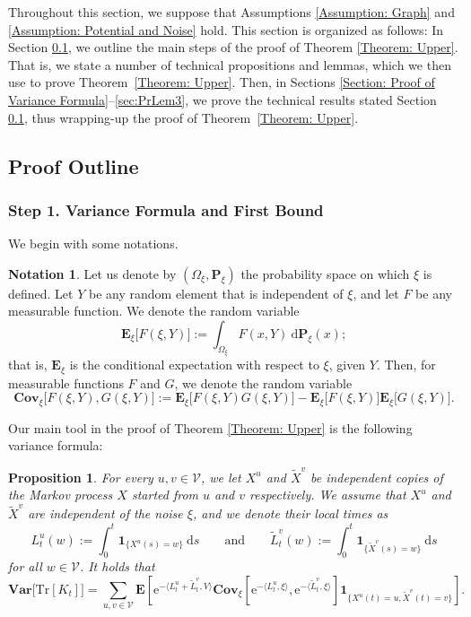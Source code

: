 \documentclass{amsart}
\numberwithin{equation}{section}
\newtheorem{proposition}[theorem]{Proposition}
\theoremstyle{definition}
\newtheorem{notation}[theorem]{Notation}
\newcommand\Om{\Omega}
\renewcommand\d{~\mathrm d}
\newcommand\mbf{\mathbf}
\newcommand\mr{\mathrm}
\newcommand\ms{\mathscr}
\begin{document}
%

Throughout this section, we suppose that Assumptions
\ref{Assumption: Graph} and \ref{Assumption: Potential and Noise} hold.
This section is organized as follows: In Section \ref{Section: Outline 2}, we outline the
main steps of the proof of Theorem \ref{Theorem: Upper}.
That is, we state a number of technical propositions and lemmas,
which we then use to prove Theorem~\ref{Theorem: Upper}. Then, in Sections
\ref{Section: Proof of Variance Formula}--\ref{sec:PrLem3}, we prove the technical results stated
Section \ref{Section: Outline 2}, thus wrapping-up the proof
of Theorem~\ref{Theorem: Upper}.


%

\subsection{Proof Outline}
\label{Section: Outline 2}

%

\subsubsection{Step 1. Variance Formula and First Bound}

%

We begin with some notations.
\begin{notation}
\label{Notation: Conditional Expectation}
Let us denote by $(\Om_\xi,\mbf P_\xi)$ the probability space on which $\xi$
is defined. Let $Y$ be any random element that is independent of $\xi$,
and let $F$ be any measurable function. We denote the random variable
\[\mbf E_\xi\big[F(\xi,Y)\big]:=\int_{\Om_\xi} F(x,Y)\d\mbf P_\xi(x);\]
that is, $\mbf E_\xi$ is the conditional expectation with respect to
$\xi$, given $Y$. Then, for measurable functions $F$ and $G$,
we denote the random variable
\[\mbf{Cov}_\xi\big[F(\xi,Y),G(\xi,Y)\big]:=\mbf E_\xi\big[F(\xi,Y)G(\xi,Y)\big]-\mbf E_\xi\big[F(\xi,Y)\big]\mbf E_\xi\big[G(\xi,Y)\big].\]
\end{notation}
Our main tool in the proof of Theorem \ref{Theorem: Upper} is the following variance formula:

%

\begin{proposition}
\label{Proposition: Variance Formula}
For every $u,v\in\ms V$,
we let $X^u$ and $\tilde X^v$ be independent
copies of the Markov process $X$ started from $u$ and $v$ respectively.
We assume that $X^u$ and $\tilde X^v$ are independent of the
noise $\xi$, and
we denote their local times as
\[L^u_t(w):=\int_0^t\mbf 1_{\{X^u(s)=w\}}\d s
\qquad\text{and}\qquad
\tilde L^v_t(w):=\int_0^t\mbf 1_{\{\tilde X^v(s)=w\}}\d s\]
for all $w\in\ms V$. It holds that
\[\mbf{Var}\big[\mr{Tr}[K_t]\big]=\sum_{u,v\in\ms V}\mbf E\left[\mr e^{-\langle L^u_t+\tilde L^v_t,V\rangle}
\mbf{Cov}_\xi\left[\mr e^{-\langle L^u_t,\xi\rangle},\mr e^{-\langle\tilde L^v_t,\xi\rangle}\right]\mbf 1_{\{X^u(t)=u,\tilde X^v(t)=v\}}\right].\]
\end{proposition}
\end{document}
